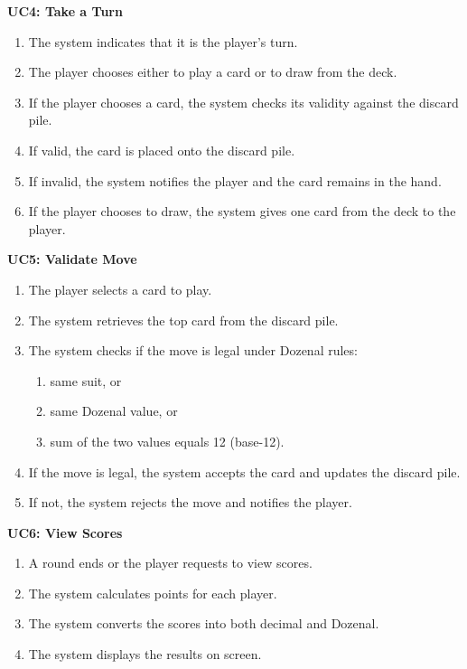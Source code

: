 \documentclass[12pt]{article}
\begin{document}
\noindent\textbf{UC4: Take a Turn}
\begin{enumerate}
    \item The system indicates that it is the player’s turn.
    \item The player chooses either to play a card or to draw from the deck.
    \item If the player chooses a card, the system checks its validity against the discard pile.
    \item If valid, the card is placed onto the discard pile.
    \item If invalid, the system notifies the player and the card remains in the hand.
    \item If the player chooses to draw, the system gives one card from the deck to the player.
\end{enumerate}

\noindent\textbf{UC5: Validate Move}
\begin{enumerate}
    \item The player selects a card to play.
    \item The system retrieves the top card from the discard pile.
    \item The system checks if the move is legal under Dozenal rules:
    \begin{enumerate}
        \item same suit, or
        \item same Dozenal value, or
        \item sum of the two values equals 12 (base-12).
    \end{enumerate}
    \item If the move is legal, the system accepts the card and updates the discard pile.
    \item If not, the system rejects the move and notifies the player.
\end{enumerate}

\noindent\textbf{UC6: View Scores}
\begin{enumerate}
    \item A round ends or the player requests to view scores.
    \item The system calculates points for each player.
    \item The system converts the scores into both decimal and Dozenal.
    \item The system displays the results on screen.
\end{enumerate}
\end{document}

